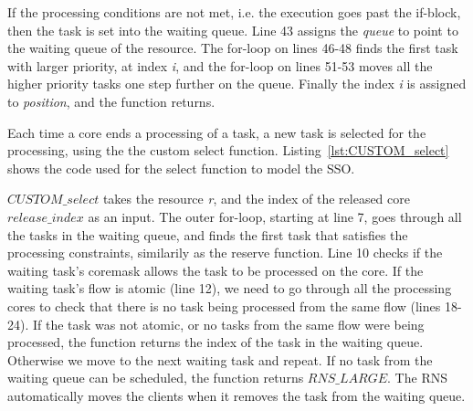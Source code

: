 If the processing conditions are not met, i.e. the execution goes past the if-block, then the task is set into the waiting queue. Line 43 assigns the \emph{queue} to point to the waiting queue of the resource. The for-loop on lines 46-48 finds the first task with larger priority, at index \emph{i}, and the for-loop on lines 51-53 moves all the higher priority tasks one step further on the queue. Finally the index \emph{i} is assigned to \emph{position}, and the function returns.

Each time a core ends a processing of a task, a new task is selected for the processing, using the the custom select function. Listing~\ref{lst:CUSTOM_select} shows the code used for the select function to model the SSO.



$CUSTOM\_select$ takes the resource \emph{r}, and the index of the released core \emph{$release\_index$} as an input. The outer for-loop, starting at line 7, goes through all the tasks in the waiting queue, and finds the first task that satisfies the processing constraints, similarily as the reserve function. Line 10 checks if the waiting task's coremask allows the task to be processed on the core. If the waiting task's flow is atomic (line 12), we need to go through all the processing cores to check that there is no task being processed from the same flow (lines 18-24). If the task was not atomic, or no tasks from the same flow were being processed, the function returns the index of the task in the waiting queue. Otherwise we move to the next waiting task and repeat. If no task from the waiting queue can be scheduled, the function returns $RNS\_LARGE$. The RNS automatically moves the clients when it removes the task from the waiting queue.

